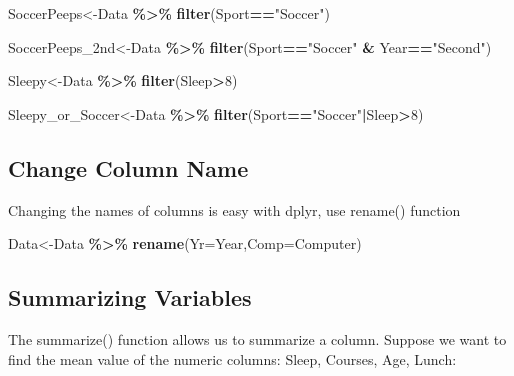 \documentclass[
  openany]{book}
\newenvironment{Shaded}{\begin{snugshade}}{\end{snugshade}}
\newcommand{\AttributeTok}[1]{\textcolor[rgb]{0.13,0.29,0.53}{#1}}
\newcommand{\DecValTok}[1]{\textcolor[rgb]{0.00,0.00,0.81}{#1}}
\newcommand{\FunctionTok}[1]{\textcolor[rgb]{0.13,0.29,0.53}{\textbf{#1}}}
\newcommand{\NormalTok}[1]{#1}
\newcommand{\OtherTok}[1]{\textcolor[rgb]{0.56,0.35,0.01}{#1}}
\newcommand{\SpecialCharTok}[1]{\textcolor[rgb]{0.81,0.36,0.00}{\textbf{#1}}}
\newcommand{\StringTok}[1]{\textcolor[rgb]{0.31,0.60,0.02}{#1}}
\begin{document}
\begin{Shaded}
\begin{Highlighting}[]
\NormalTok{SoccerPeeps}\OtherTok{\textless{}{-}}\NormalTok{Data }\SpecialCharTok{\%\textgreater{}\%} 
  \FunctionTok{filter}\NormalTok{(Sport}\SpecialCharTok{==}\StringTok{"Soccer"}\NormalTok{)}

\NormalTok{SoccerPeeps\_2nd}\OtherTok{\textless{}{-}}\NormalTok{Data }\SpecialCharTok{\%\textgreater{}\%} 
  \FunctionTok{filter}\NormalTok{(Sport}\SpecialCharTok{==}\StringTok{"Soccer"} \SpecialCharTok{\&}\NormalTok{ Year}\SpecialCharTok{==}\StringTok{"Second"}\NormalTok{)}

\NormalTok{Sleepy}\OtherTok{\textless{}{-}}\NormalTok{Data }\SpecialCharTok{\%\textgreater{}\%} 
  \FunctionTok{filter}\NormalTok{(Sleep}\SpecialCharTok{\textgreater{}}\DecValTok{8}\NormalTok{)}

\NormalTok{Sleepy\_or\_Soccer}\OtherTok{\textless{}{-}}\NormalTok{Data }\SpecialCharTok{\%\textgreater{}\%} 
  \FunctionTok{filter}\NormalTok{(Sport}\SpecialCharTok{==}\StringTok{"Soccer"}\SpecialCharTok{|}\NormalTok{Sleep}\SpecialCharTok{\textgreater{}}\DecValTok{8}\NormalTok{)}
\end{Highlighting}
\end{Shaded}

\subsection{Change Column Name}\label{change-column-name}

Changing the names of columns is easy with dplyr, use rename() function

\begin{Shaded}
\begin{Highlighting}[]
\NormalTok{Data}\OtherTok{\textless{}{-}}\NormalTok{Data }\SpecialCharTok{\%\textgreater{}\%} 
  \FunctionTok{rename}\NormalTok{(}\AttributeTok{Yr=}\NormalTok{Year,}\AttributeTok{Comp=}\NormalTok{Computer)}
\end{Highlighting}
\end{Shaded}

\subsection{Summarizing Variables}\label{summarizing-variables-1}

The summarize() function allows us to summarize a column. Suppose we want to find the mean value of the numeric columns: Sleep, Courses, Age, Lunch:
\end{document}
